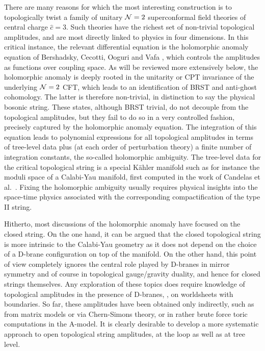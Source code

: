 There are many reasons for which the most interesting construction is to 
topologically twist a family of 
unitary ${\cal N}=2$ superconformal field theories of central charge
$\hat c=3$. Such theories have the richest set of non-trivial topological
amplitudes, and are most directly linked to physics in four dimensions.
In this critical instance, the relevant differential equation is the 
holomorphic anomaly equation of Bershadsky, Cecotti, Ooguri and
Vafa \cite{bcov1,bcov2}, which controls the amplitudes as functions over
coupling space. As will be reviewed more extensively below, the 
holomorphic anomaly is deeply rooted in the unitarity or CPT invariance 
of the underlying ${\cal N}=2$ CFT, which leads to an identification of 
BRST and anti-ghost cohomology. The latter is therefore non-trivial, in 
distinction to say the physical bosonic string. These states, 
although BRST trivial, do not decouple from the topological amplitudes,
but they fail to do so in a very controlled fashion, precisely captured
by the holomorphic anomaly equation. The integration of this equation 
leads to polynomial expressions for all
topological amplitudes in terms of tree-level data plus (at each order
of perturbation theory) a finite number of integration constants,
the so-called holomorphic ambiguity. The tree-level data for the 
critical topological string is a special K\"ahler manifold such as for
instance the moduli space of a Calabi-Yau manifold, first computed in
the work of Candelas et al.\ \cite{cdgp}. Fixing the holomorphic 
ambiguity usually requires physical insights into the space-time physics 
associated with the corresponding compactification of the type II string.

Hitherto, most discussions of the holomorphic anomaly have focused on the
closed string. On the one hand, it can be argued that the closed 
topological string is more intrinsic to the Calabi-Yau geometry as 
it does not depend on the choice of a D-brane configuration on top of 
the manifold. On the other hand, this point of view completely ignores 
the central role played by D-branes in mirror symmetry and of course in 
topological gauge/gravity duality, and hence for closed strings themselves.
Any exploration of these topics does require knowledge of topological
amplitudes in the presence of D-branes, \ie, on worldsheets with
boundaries. So far, these amplitudes have been obtained only 
indirectly, such as from matrix models or via Chern-Simons theory, 
or in rather brute force toric computations in the A-model. It is
clearly desirable to develop a more systematic approach to open
topological string amplitudes, at the loop as well as at tree level.

